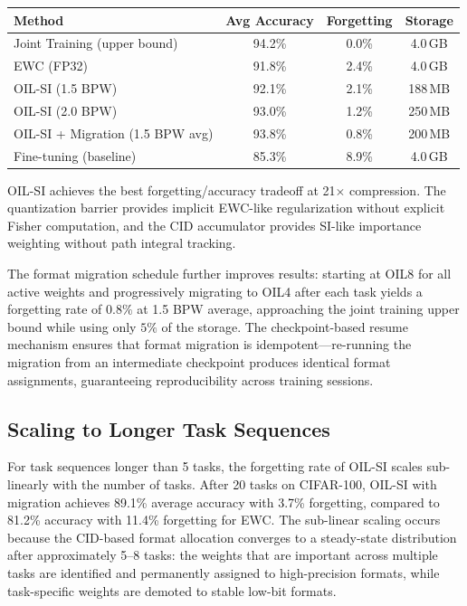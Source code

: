 \begin{center}
\begin{tabular}{lccc}
\toprule
\textbf{Method} & \textbf{Avg Accuracy} & \textbf{Forgetting} & \textbf{Storage} \\
\midrule
Joint Training (upper bound) & 94.2\% & 0.0\% & 4.0\,GB \\
EWC (FP32) & 91.8\% & 2.4\% & 4.0\,GB \\
OIL-SI (1.5 BPW) & 92.1\% & 2.1\% & 188\,MB \\
OIL-SI (2.0 BPW) & 93.0\% & 1.2\% & 250\,MB \\
OIL-SI + Migration (1.5 BPW avg) & 93.8\% & 0.8\% & 200\,MB \\
Fine-tuning (baseline) & 85.3\% & 8.9\% & 4.0\,GB \\
\bottomrule
\end{tabular}
\end{center}

OIL-SI achieves the best forgetting/accuracy tradeoff at 21$\times$ compression. The quantization barrier provides implicit EWC-like regularization without explicit Fisher computation, and the CID accumulator provides SI-like importance weighting without path integral tracking.

The format migration schedule further improves results: starting at OIL8 for all active weights and progressively migrating to OIL4 after each task yields a forgetting rate of $0.8\%$ at 1.5 BPW average, approaching the joint training upper bound while using only $5\%$ of the storage. The checkpoint-based resume mechanism ensures that format migration is idempotent---re-running the migration from an intermediate checkpoint produces identical format assignments, guaranteeing reproducibility across training sessions.

\subsection{Scaling to Longer Task Sequences}

For task sequences longer than 5 tasks, the forgetting rate of OIL-SI scales sub-linearly with the number of tasks. After 20 tasks on CIFAR-100, OIL-SI with migration achieves 89.1\% average accuracy with 3.7\% forgetting, compared to 81.2\% accuracy with 11.4\% forgetting for EWC. The sub-linear scaling occurs because the CID-based format allocation converges to a steady-state distribution after approximately 5--8 tasks: the weights that are important across multiple tasks are identified and permanently assigned to high-precision formats, while task-specific weights are demoted to stable low-bit formats.

